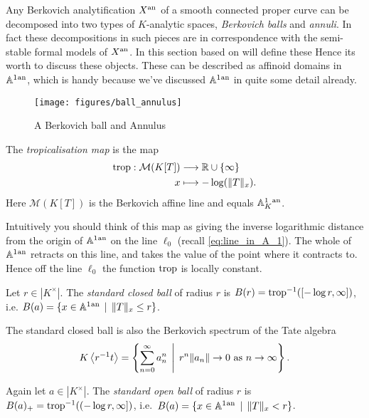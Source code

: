 Any Berkovich analytification $X{}^{\text{an}}$ of a smooth connected proper curve can be decomposed into two types of $K$-analytic spaces, \emph{Berkovich balls} and \emph{annuli}.
In fact these decompositions in such pieces are in correspondence with the semi-stable formal models of $X{}^{\text{an}}$. 
In this section based on \cite[sec.\ 2]{bakerStructureNonarchimedeanAnalytic2013} will define these  
Hence its worth to discuss these objects. 
These can be described as affinoid domains in $\mathbb{A}^{1}{}^{\text{an}}$, which is handy because we've discussed $\mathbb{A}^{1}{}^{\text{an}}$ in quite some detail already.  
\begin{figure}[h]
	\centering
	\texttt{[image: figures/ball\_annulus]}
	\caption{A Berkovich ball and Annulus}
	\label{fig:ball_annulus}
\end{figure}
\begin{definition}
	The \emph{tropicalisation map} is the map 
	\begin{align*}
		\operatorname{trop} :  \mathcal{M} (K[T]) &\longrightarrow \mathbb{R} \cup \{\infty\}  \\
		x &\longmapsto -\log( \|T\|_x)
	.\end{align*}
	Here $\mathcal{M} (K[T])$ is the Berkovich affine line and equals $\mathbb{A}^{1}_K{}^{\text{an}}$. 
\end{definition}
Intuitively you should think of this map as giving the inverse logarithmic distance from the origin of $\mathbb{A}^{1}{}^{\text{an}}$ on the line $\ell_0$ (recall \cref{eq:line_in_A_1}).  
The whole of $\mathbb{A}^{1}{}^{\text{an}} $ retracts on this line, and takes the value of the point where it contracts to. Hence off the line $\ell_0$ the function $\operatorname{trop}$ is locally constant. 



\begin{definition}
	Let $r \in |K^{\times }|$. The \emph{standard closed ball} of radius $r$ is $B(r) = \operatorname{trop}^{-1}([-\log r, \infty])$, i.e. $B(a) = \{x \in \aff^{1}\an \st \|T\|_x \le r\} $. 
\end{definition}
The standard closed ball is also the Berkovich spectrum of the Tate algebra \[
K\left<r^{-1}t \right> = \left\{\sum_{n = 0}^{\infty} a_n ^{n} \st r ^{n} \|a_n\| \to 0 \text{ as } n \to \infty \right\} 
.\] 
\begin{definition}
	Again let $a \in |K^{\times }|$. 
	The \emph{standard open ball} of radius $r$ is $B(a)_+ = \operatorname{trop}^{-1}((-\log r, \infty])$, i.e.\ $B(a) = \{x \in \aff^{1}\an \st \|T\|_x <  r\} $.
\end{definition}

